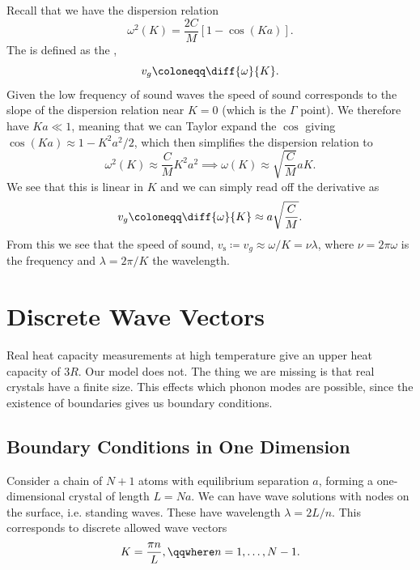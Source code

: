 \documentclass[fleqn]{NotesClass}
\newcommand*{\sound}{\mathrm{s}}
\begin{document}
    Recall that we have the dispersion relation
    \begin{equation}
        \omega^2(K) = \frac{2C}{M}[1 - \cos(Ka)].
    \end{equation}
    The  is defined as the ,
    \begin{equation}
        v_g \coloneqq \diff{\omega}{K}.
    \end{equation}
    Given the low frequency of sound waves the speed of sound corresponds to the slope of the dispersion relation near \(K = 0\) (which is the \(\Gamma\) point).
    We therefore have \(Ka \ll 1\), meaning that we can Taylor expand the \(\cos\) giving \(\cos(Ka) \approx 1 - K^2a^2/2\), which then simplifies the dispersion relation to
    \begin{equation}
        \omega^2(K) \approx\frac{C}{M} K^2a^2 \implies \omega(K) \approx \sqrt{\frac{C}{M}}aK.
    \end{equation}
    We see that this is linear in \(K\) and we can simply read off the derivative as
    \begin{equation}
        v_g \coloneqq \diff{\omega}{K} \approx a\sqrt{\frac{C}{M}}.
    \end{equation}
    From this we see that the speed of sound, \(v_{\sound} \coloneqq v_g \approx \omega/K = \nu \lambda\), where \(\nu = 2\pi\omega\) is the frequency and \(\lambda = 2\pi/K\) the wavelength.
    
    \section{Discrete Wave Vectors}
    Real heat capacity measurements at high temperature give an upper heat capacity of \(3R\).
    Our model does not.
    The thing we are missing is that real crystals have a finite size.
    This effects which phonon modes are possible, since the existence of boundaries gives us boundary conditions.
    
    \subsection{Boundary Conditions in One Dimension}
    Consider a chain of \(N + 1\) atoms with equilibrium separation \(a\), forming a one-dimensional crystal of length \(L = Na\).
    We can have wave solutions with nodes on the surface, i.e. standing waves.
    These have wavelength \(\lambda = 2L/n\).
    This corresponds to discrete allowed wave vectors
    \begin{equation}
        K = \frac{\pi n}{L}, \qqwhere n = 1, \dotsc, N - 1.
    \end{equation}
    
\end{document}
